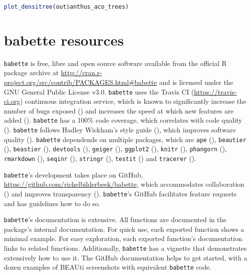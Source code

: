 \documentclass{article}
\begin{document}
\begin{lstlisting}[language=R, floatplacement=H]
plot_densitree(out$anthus_aco_trees)
\end{lstlisting}

\section{babette resources}

\verb;babette; is free, libre and open source software available 
from the official R package archive at 
\url{http://cran.r-project.org/src/contrib/PACKAGES.html\#babette}
and is licensed under the GNU General Public License v3.0.
\verb;babette; uses the Travis CI (\url{https://travis-ci.org})
continuous integration service, which is known to significantly 
increase the number of bugs exposed (\cite{vasilescu2015}) and increases
the speed at which new features are added (\cite{vasilescu2015}).
\verb;babette; has a 100\% code coverage, which correlates with 
code quality (\cite{horgan1994,del1995correlation}). 
\verb;babette; follows Hadley Wickham's style guide (\cite{style_guide}), 
which improves software quality (\cite{fang2001}).
\verb;babette; dependends on multiple packages, which are 
\verb;ape; (\cite{APE}), 
\verb;beautier; (\cite{beautier}),
\verb;beastier; (\cite{beastier}),
\verb;devtools; (\cite{devtools}),
\verb;geiger; (\cite{GEIGER}),
\verb;ggplot2; (\cite{ggplot2}),
\verb;knitr; (\cite{knitr}),
\verb;phangorn; (\cite{phangorn}),
\verb;rmarkdown; (\cite{rmarkdown}),
\verb;seqinr; (\cite{seqinr}),
\verb;stringr; (\cite{stringr}),
\verb;testit; (\cite{testit}) and 
\verb;tracerer; (\cite{tracerer}).

\verb;babette;'s development takes place on GitHub,
\url{https://github.com/richelbilderbeek/babette}, 
which accommodates collaboration (\cite{perez2016ten}) 
and improves transparency (\cite{gorgolewski2016practical}).
\verb;babette;'s GitHub facilitates feature requests and has guidelines how to do so.

\verb;babette;'s documentation is extensive. All functions are documented
in the package's internal documentation. For quick use, 
each exported function shows a minimal example. 
For easy exploration, each exported function's documentation links to related functions.
Additionally, \verb;babette; has a vignette that demonstrates extensively how
to use it. The GitHub documentation helps to get started, with a dozen examples 
of BEAUti screenshots with equivalent \verb;babette; code.
\end{document}
